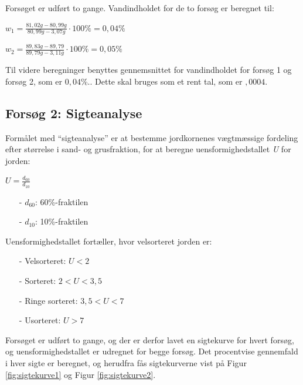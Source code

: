 Forsøget er udført to gange. Vandindholdet for de to forsøg er beregnet til:

\begin{center}
	$w_1 = \frac{81,\!02 g - 80,\!99 g}{80,\!99 g - 3,\!07 g}\cdot 100\% = 0,\!04\%$
\end{center}

\begin{center}
	$w_2 = \frac{89,\!83 g - 89,\!79}{89,\!79 g - 3,\!11 g}\cdot 100\% = 0,\!05\%$
\end{center}

Til videre beregninger benyttes gennemsnittet for vandindholdet for forsøg 1 og forsøg 2, som er $0,\!04$\%.. Dette skal bruges som et rent tal, som er $,\!0004$. 

\subsection{Forsøg 2: Sigteanalyse}
Formålet med “sigteanalyse” er at bestemme jordkornenes vægtmæssige fordeling efter størrelse i sand- og grusfraktion, for at beregne uensformighedstallet \textit{U} for jorden:

\begin{center}
	$U = \frac{d_{60}}{d_{10}}$
\end{center}

\begin{itemize}
	\item[-] $d_{60}$: 60\%-fraktilen
	\item[-] $d_{10}$: 10\%-fraktilen
\end{itemize}

Uensformighedstallet fortæller, hvor velsorteret jorden er:

\begin{itemize}
	\item[-] Velsorteret: $U < 2$
	\item[-] Sorteret: $2 < U < 3,\!5$
	\item[-] Ringe sorteret: $3,\!5 < U < 7$
	\item[-] Usorteret: $U > 7$
\end{itemize}

Forsøget er udført to gange, og der er derfor lavet en sigtekurve for hvert forsøg, og uensformighedstallet er udregnet for begge forsøg. 
\newline \indent{     }  Det procentvise gennemfald i hver sigte er beregnet, og herudfra fås sigtekurverne vist på Figur \ref{fig:sigtekurve1} og Figur \ref{fig:sigtekurve2}.

